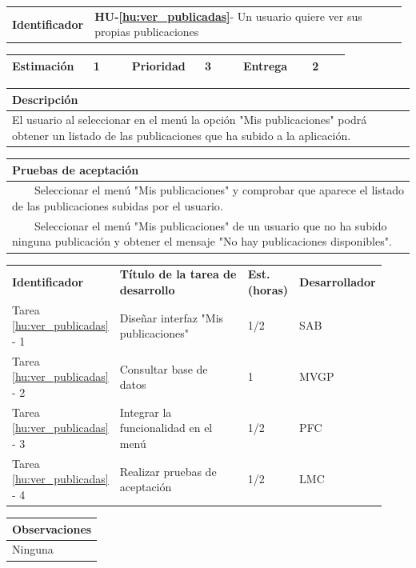 \documentclass[11pt]{article}
\newcommand{\tabitem}{~~\llap{\textbullet}~~}
\begin{document}
\begin{longtable}{p{0.18\linewidth}|p{0.8\linewidth}}
  \rowcolor{LightCyan}
  \textbf{Identificador} & \textbf{HU-\ref{hu:ver_publicadas}}- Un usuario quiere ver sus propias publicaciones \\  
\end{longtable}
\vspace{-0.8cm}
\begin{longtable}{p{0.18\linewidth}|p{0.1\linewidth}|p{0.18\linewidth}|p{0.1\linewidth}|p{0.18\linewidth}|p{0.1\linewidth}}
  \toprule
  \textbf{Estimación} & 1 & \textbf{Prioridad} & 3 & \textbf{Entrega} & 2 \\
  \bottomrule
\end{longtable}
\vspace{-0.8cm}
\begin{longtable}{p{1.028\linewidth}}
  \textbf{Descripción}\\
  \midrule
 El usuario al seleccionar en el menú la opción "Mis publicaciones" podrá obtener un listado de las publicaciones que ha subido a la aplicación. \\
  \bottomrule
\end{longtable}
\vspace{-0.8cm}
\begin{longtable}{p{1.028\linewidth}}
  \textbf{Pruebas de aceptación}\\
  \midrule
  \tabitem Seleccionar el menú "Mis publicaciones" y comprobar que aparece el listado de las publicaciones subidas por el usuario.\\
  \tabitem Seleccionar el menú "Mis publicaciones" de un usuario que no ha subido ninguna publicación y obtener el mensaje "No hay publicaciones disponibles".\\
\end{longtable}
\vspace{-0.8cm}
\begin{longtable}{p{0.18\linewidth}|p{0.48\linewidth}|p{0.1\linewidth}|p{0.17\linewidth}}
  \toprule
  \textbf{Identificador} & \textbf{Título de la tarea de desarrollo} & \textbf{Est. (horas)} & \textbf{Desarrollador} \\
  Tarea \ref{hu:ver_publicadas} - 1 & Diseñar interfaz "Mis publicaciones" & 1/2 & SAB\\
  Tarea \ref{hu:ver_publicadas} - 2 & Consultar base de datos & 1 & MVGP \\
  Tarea \ref{hu:ver_publicadas} - 3 & Integrar la funcionalidad en el menú & 1/2 & PFC\\
  Tarea \ref{hu:ver_publicadas} - 4 & Realizar pruebas de aceptación & 1/2 &  LMC\\
  \bottomrule
\end{longtable}
\vspace{-0.8cm}
\begin{longtable}{p{1.028\linewidth}}
  \textbf{Observaciones}\\
  \midrule
  Ninguna\\
  \bottomrule
\end{longtable}
\end{document}

